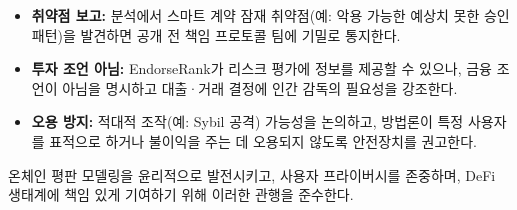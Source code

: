 \begin{itemize}
\item[\textbullet] \textbf{취약점 보고:} 분석에서 스마트 계약 잠재 취약점(예: 악용 가능한 예상치 못한 승인 패턴)을 발견하면 공개 전 책임 프로토콜 팀에 기밀로 통지한다.
\end{itemize}

\begin{itemize}
\item[\textbullet] \textbf{투자 조언 아님:} EndorseRank가 리스크 평가에 정보를 제공할 수 있으나, 금융 조언이 아님을 명시하고 대출·거래 결정에 인간 감독의 필요성을 강조한다.
\item[\textbullet] \textbf{오용 방지:} 적대적 조작(예: Sybil 공격) 가능성을 논의하고, 방법론이 특정 사용자를 표적으로 하거나 불이익을 주는 데 오용되지 않도록 안전장치를 권고한다.
\end{itemize}
온체인 평판 모델링을 윤리적으로 발전시키고, 사용자 프라이버시를 존중하며, DeFi 생태계에 책임 있게 기여하기 위해 이러한 관행을 준수한다.
